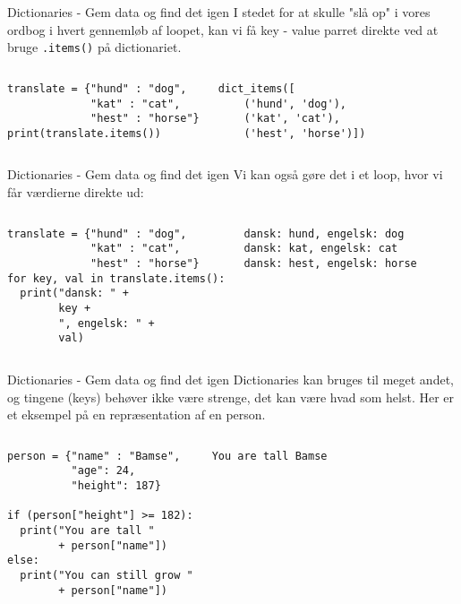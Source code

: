 \begin{frame}[fragile]{Dictionaries - Gem data og find det igen}
	I stedet for at skulle "slå op" i vores ordbog i hvert gennemløb af loopet, kan vi få key - value parret direkte ved at bruge \texttt{.items()} på dictionariet.
	\begin{columns}
		\begin{lstlisting}[style=python]
translate = {"hund" : "dog", 
             "kat" : "cat", 
             "hest" : "horse"}
print(translate.items())
		\end{lstlisting}
		
		\pause
		\begin{lstlisting}[style=python]
dict_items([
	('hund', 'dog'), 
	('kat', 'cat'), 
	('hest', 'horse')])
		\end{lstlisting}
	\end{columns}	
\end{frame}

\begin{frame}[fragile]{Dictionaries - Gem data og find det igen}
	Vi kan også gøre det i et loop, hvor vi får værdierne direkte ud:
	\begin{columns}
		\column{0.55\textwidth}
		\begin{lstlisting}[style=python]
translate = {"hund" : "dog", 
             "kat" : "cat", 
             "hest" : "horse"}
for key, val in translate.items():
  print("dansk: " + 
        key + 
        ", engelsk: " + 
        val)
		\end{lstlisting}
		
		\pause
		\column{0.44\textwidth}
		\begin{lstlisting}[style=python]
dansk: hund, engelsk: dog
dansk: kat, engelsk: cat
dansk: hest, engelsk: horse
		\end{lstlisting}
	\end{columns}	
\end{frame}

\begin{frame}[fragile]{Dictionaries - Gem data og find det igen}
	Dictionaries kan bruges til meget andet, og tingene (keys) behøver ikke være strenge, det kan være hvad som helst. Her er et eksempel på en repræsentation af en person.
	\begin{columns}
		\column{0.5\textwidth}
		\begin{lstlisting}[style=python]
person = {"name" : "Bamse",
          "age": 24,
          "height": 187}

if (person["height"] >= 182):
  print("You are tall "
        + person["name"])
else:
  print("You can still grow "
        + person["name"])
		\end{lstlisting}
		
		\pause
		\column{0.3\textwidth}
		\begin{lstlisting}[style=python]
You are tall Bamse
		\end{lstlisting}
	\end{columns}	
\end{frame}

